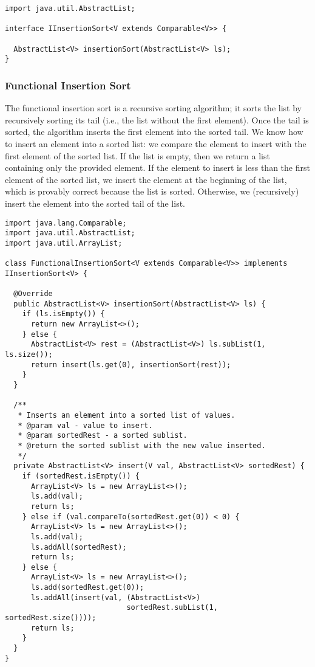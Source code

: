 \begin{lstlisting}[language=MyJava]
import java.util.AbstractList;

interface IInsertionSort<V extends Comparable<V>> {

  AbstractList<V> insertionSort(AbstractList<V> ls);
}
\end{lstlisting}

\newpage
\subsubsection*{Functional Insertion Sort}

The functional insertion sort is a recursive sorting algorithm; it sorts the list by recursively sorting its tail (i.e., the list without the first element). Once the tail is sorted, the algorithm inserts the first element into the sorted tail.
We know how to insert an element into a sorted list: we compare the element to insert with the first element of the sorted list. 
If the list is empty, then we return a list containing only the provided element.
If the element to insert is less than the first element of the sorted list, we insert the element at the beginning of the list, which is provably correct because the list is sorted. 
Otherwise, we (recursively) insert the element into the sorted tail of the list.

\begin{lstlisting}[language=MyJava]
import java.lang.Comparable;
import java.util.AbstractList;
import java.util.ArrayList;

class FunctionalInsertionSort<V extends Comparable<V>> implements IInsertionSort<V> {
  
  @Override
  public AbstractList<V> insertionSort(AbstractList<V> ls) {
    if (ls.isEmpty()) { 
      return new ArrayList<>(); 
    } else { 
      AbstractList<V> rest = (AbstractList<V>) ls.subList(1, ls.size());
      return insert(ls.get(0), insertionSort(rest)); 
    }
  }

  /**
   * Inserts an element into a sorted list of values.
   * @param val - value to insert.
   * @param sortedRest - a sorted sublist.
   * @return the sorted sublist with the new value inserted.
   */
  private AbstractList<V> insert(V val, AbstractList<V> sortedRest) {
    if (sortedRest.isEmpty()) {
      ArrayList<V> ls = new ArrayList<>();
      ls.add(val);
      return ls;
    } else if (val.compareTo(sortedRest.get(0)) < 0) {
      ArrayList<V> ls = new ArrayList<>();
      ls.add(val);
      ls.addAll(sortedRest);
      return ls;
    } else {
      ArrayList<V> ls = new ArrayList<>();
      ls.add(sortedRest.get(0));
      ls.addAll(insert(val, (AbstractList<V>) 
                            sortedRest.subList(1, sortedRest.size())));
      return ls;
    }
  }
}
\end{lstlisting}

